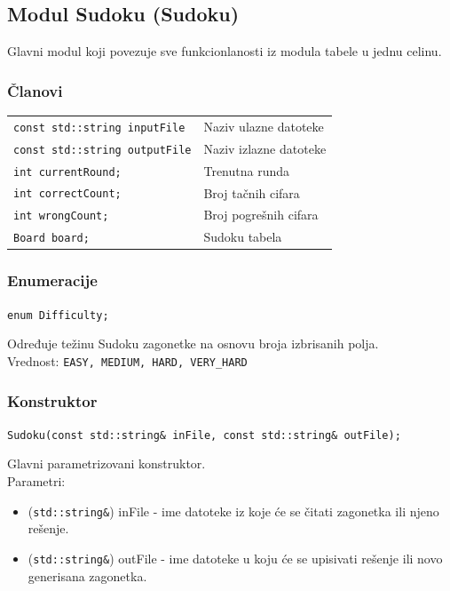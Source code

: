 \documentclass[a4paper]{article}
\begin{document}
    \subsection{Modul Sudoku (Sudoku)}
    Glavni modul koji povezuje sve funkcionlanosti iz modula tabele u jednu celinu.
    \subsubsection{Članovi}
    \begin{tabular}{ l l }
        \texttt{const std::string inputFile} & Naziv ulazne datoteke\\
        \texttt{const std::string outputFile} & Naziv izlazne datoteke\\
        \texttt{int currentRound;} & Trenutna runda\\
        \texttt{int correctCount;} & Broj tačnih cifara\\
        \texttt{int wrongCount;} & Broj pogrešnih cifara\\
        \texttt{Board board;} & Sudoku tabela\\
    \end{tabular}
    
    \subsubsection{Enumeracije}
    \texttt{enum Difficulty;}
    \par Određuje težinu Sudoku zagonetke na osnovu broja izbrisanih polja. \\ 
    Vrednost: \texttt{EASY, MEDIUM, HARD, VERY\_HARD}

    \subsubsection{Konstruktor}
    {\parindent0pt
    \texttt{Sudoku(const std::string\& inFile, const std::string\& outFile);}
    }
    \par Glavni parametrizovani konstruktor.\\
    Parametri:
    \begin{itemize}
        \item (\texttt{std::string\&}) inFile - ime datoteke iz koje će se čitati zagonetka ili njeno rešenje.
        \item (\texttt{std::string\&}) outFile - ime datoteke u koju će se upisivati rešenje ili novo generisana zagonetka.
    \end{itemize}
\end{document}
